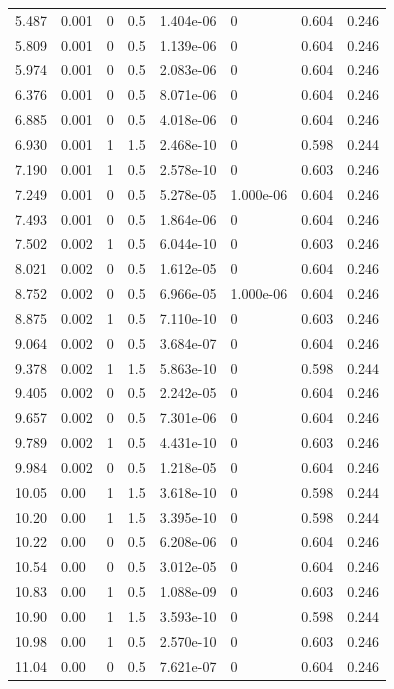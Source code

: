\documentclass[preview]{standalone}
\begin{document}
{{\begin{tabular}{L{1.2cm}C{1.2cm} C{0.3cm}C{0.5cm} C{1.4cm}C{1.4cm} C{1.4cm}C{1.4cm}}
  5.487  &  0.001  & 0     & 0.5 &  1.404e-06  & 0  & 0.604 &  0.246   \\ 
  5.809  &  0.001  & 0     & 0.5 &  1.139e-06  & 0  & 0.604 &  0.246   \\ 
  5.974  &  0.001  & 0     & 0.5 &  2.083e-06  & 0  & 0.604 &  0.246   \\ 
  6.376  &  0.001  & 0     & 0.5 &  8.071e-06  & 0  & 0.604 &  0.246   \\ 
  6.885  &  0.001  & 0     & 0.5 &  4.018e-06  & 0  & 0.604 &  0.246   \\ 
  6.930  &  0.001  & 1     & 1.5 &  2.468e-10  & 0  & 0.598 &  0.244   \\ 
  7.190  &  0.001  & 1     & 0.5 &  2.578e-10  & 0  & 0.603 &  0.246   \\ 
  7.249  &  0.001  & 0     & 0.5 &  5.278e-05  & 1.000e-06  & 0.604 &  0.246   \\ 
  7.493  &  0.001  & 0     & 0.5 &  1.864e-06  & 0  & 0.604 &  0.246   \\ 
  7.502  &  0.002  & 1     & 0.5 &  6.044e-10  & 0  & 0.603 &  0.246   \\ 
  8.021  &  0.002  & 0     & 0.5 &  1.612e-05  & 0  & 0.604 &  0.246   \\ 
  8.752  &  0.002  & 0     & 0.5 &  6.966e-05  & 1.000e-06  & 0.604 &  0.246   \\ 
  8.875  &  0.002  & 1     & 0.5 &  7.110e-10  & 0  & 0.603 &  0.246   \\ 
  9.064  &  0.002  & 0     & 0.5 &  3.684e-07  & 0  & 0.604 &  0.246   \\ 
  9.378  &  0.002  & 1     & 1.5 &  5.863e-10  & 0  & 0.598 &  0.244   \\ 
  9.405  &  0.002  & 0     & 0.5 &  2.242e-05  & 0  & 0.604 &  0.246   \\ 
  9.657  &  0.002  & 0     & 0.5 &  7.301e-06  & 0  & 0.604 &  0.246   \\ 
  9.789  &  0.002  & 1     & 0.5 &  4.431e-10  & 0  & 0.603 &  0.246   \\ 
  9.984  &  0.002  & 0     & 0.5 &  1.218e-05  & 0  & 0.604 &  0.246   \\ 
  10.05  &  0.00  & 1     & 1.5 &  3.618e-10  & 0  & 0.598 &  0.244   \\ 
  10.20  &  0.00  & 1     & 1.5 &  3.395e-10  & 0  & 0.598 &  0.244   \\ 
  10.22  &  0.00  & 0     & 0.5 &  6.208e-06  & 0  & 0.604 &  0.246   \\ 
  10.54  &  0.00  & 0     & 0.5 &  3.012e-05  & 0  & 0.604 &  0.246   \\ 
  10.83  &  0.00  & 1     & 0.5 &  1.088e-09  & 0  & 0.603 &  0.246   \\ 
  10.90  &  0.00  & 1     & 1.5 &  3.593e-10  & 0  & 0.598 &  0.244   \\ 
  10.98  &  0.00  & 1     & 0.5 &  2.570e-10  & 0  & 0.603 &  0.246   \\ 
  11.04  &  0.00  & 0     & 0.5 &  7.621e-07  & 0  & 0.604 &  0.246   \\ 
\hline 
\end{tabular} 

}}
\end{document}
